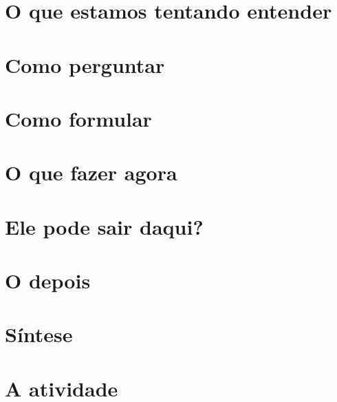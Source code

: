 \documentclass[aspectratio=43, handout]{beamer}
\begin{document}
\section{O que estamos tentando entender}
\section{Como perguntar}
\section{Como formular}
\section{O que fazer agora}
\section{Ele pode sair daqui?}
\section{O depois}
\section{S\'intese}
\section{A atividade}
\end{document}
